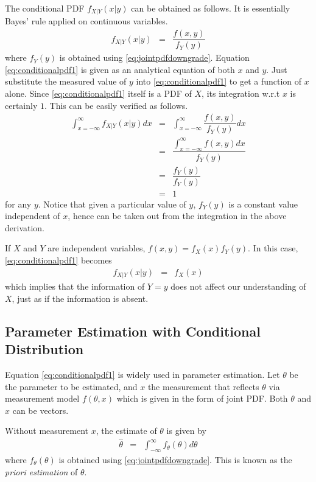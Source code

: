The conditional PDF $f_{X|Y}(x|y)$ can be obtained as follows. It is essentially Bayes' rule applied on continuous variables.
\begin{eqnarray}
  f_{X|Y}(x|y) &=& \dfrac{f(x, y)}{f_Y(y)} \label{eq:conditionalpdf1}
\end{eqnarray}
where $f_Y(y)$ is obtained using \eqref{eq:jointpdfdowngrade}. Equation \eqref{eq:conditionalpdf1} is given as an analytical equation of both $x$ and $y$. Just substitute the measured value of $y$ into \eqref{eq:conditionalpdf1} to get a function of $x$ alone. Since \eqref{eq:conditionalpdf1} itself is a PDF of $X$, its integration w.r.t $x$ is certainly $1$. This can be easily verified as follows.
\begin{eqnarray}
  \int_{x=-\infty}^{\infty}f_{X|Y}(x|y)dx &=& \int_{x=-\infty}^{\infty}\dfrac{f(x, y)}{f_Y(y)}dx \nonumber \\
  &=& \dfrac{\int_{x=-\infty}^{\infty}f(x, y)dx}{f_Y(y)} \nonumber \\
  &=& \dfrac{f_Y(y)}{f_Y(y)} \nonumber \\
  &=& 1 \nonumber
\end{eqnarray}
for any $y$. Notice that given a particular value of $y$, $f_Y(y)$ is a constant value independent of $x$, hence can be taken out from the integration in the above derivation.

If $X$ and $Y$ are independent variables, $f(x,y) = f_X(x)f_Y(y)$. In this case, \eqref{eq:conditionalpdf1} becomes
\begin{eqnarray}
  f_{X|Y}(x|y) &=& f_X(x) \nonumber
\end{eqnarray}
which implies that the information of $Y=y$ does not affect our understanding of $X$, just as if the information is absent.

\subsection{Parameter Estimation with Conditional Distribution}

Equation \eqref{eq:conditionalpdf1} is widely used in parameter estimation. Let $\theta$ be the parameter to be estimated, and $x$ the measurement that reflects $\theta$ via measurement model $f(\theta, x)$ which is given in the form of joint PDF. Both $\theta$ and $x$ can be vectors.

Without measurement $x$, the estimate of $\theta$ is given by
\begin{eqnarray}
	\hat{\theta} &=& \int_{-\infty}^{\infty} f_\theta(\theta) d\theta \nonumber
\end{eqnarray}
where $f_\theta(\theta)$ is obtained using \eqref{eq:jointpdfdowngrade}. This is known as the \textit{priori estimation} of $\theta$. 

